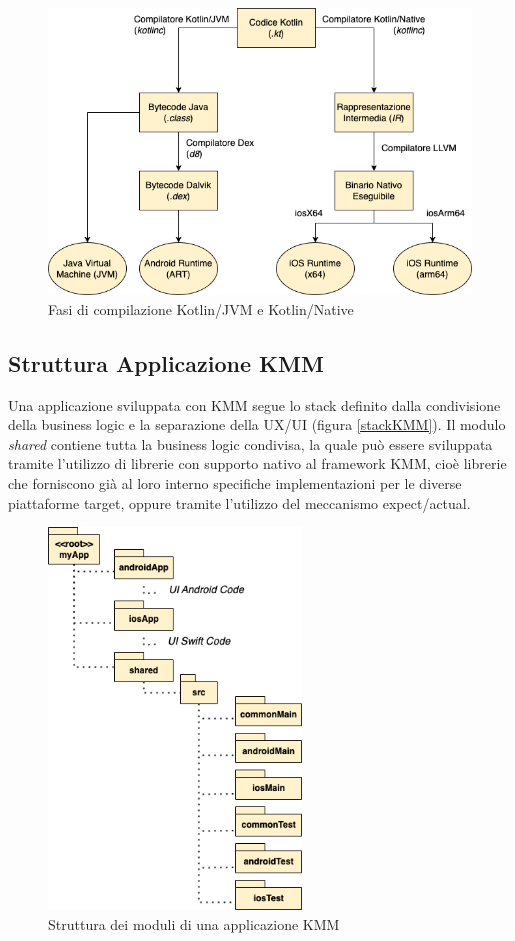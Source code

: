 \begin{figure}[H]
    \centering
    \includegraphics[width=1\textwidth]{img/compilatore_kotlin.png}
    \caption{Fasi di compilazione Kotlin/JVM e Kotlin/Native}
\end{figure}

\subsection{Struttura Applicazione KMM}
Una applicazione sviluppata con KMM segue lo stack definito dalla condivisione della business logic e la separazione della UX/UI (figura \ref{stackKMM}). Il modulo \textit{shared} contiene tutta la business logic condivisa, la quale può essere sviluppata tramite l'utilizzo di librerie con supporto nativo al framework KMM, cioè librerie che forniscono già al loro interno specifiche implementazioni per le diverse piattaforme target, oppure tramite l'utilizzo del meccanismo expect/actual.

\begin{figure}[H]
    \centering
    \includegraphics[width=0.6\textwidth]{img/struttura_app_kmm.png}
    \caption{Struttura dei moduli di una applicazione KMM}
\end{figure}

